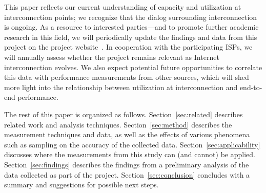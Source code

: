 This paper reflects our current understanding of capacity and
utilization at interconnection points; we recognize that the dialog
surrounding interconnection is ongoing.  As a resource to interested
parties---and to promote further academic research in this field, 
we will periodically update the 
findings and data from this project on the project
website~\cite{www-citp-interconnection}. In cooperation with the
participating ISPs, we will annually assess whether the project remains
relevant as Internet interconnection evolves. We also expect
potential future opportunities to correlate this data with
performance measurements from other sources, which will shed more
light into the relationship between utilization at 
interconnection and end-to-end performance.

The rest of this paper is organized as follows.
Section~\ref{sec:related} describes related work and analysis
techniques. Section~\ref{sec:method} describes the measurement techniques and
data, as well as the effects of
various phenomena such as sampling on the accuracy of the collected
data. Section~\ref{sec:applicability} discusses where the measurements
  from this study can (and cannot) be applied. 
  Section~\ref{sec:findings} describes the findings from a preliminary
  analysis of the data collected as part of the
  project. Section~\ref{sec:conclusion} concludes with a summary and
  suggestions for possible next steps.